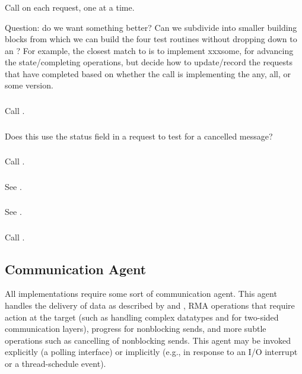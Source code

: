 \documentclass{article}
\begin{document}
\subsubsection{}
Call  on each request, one at a time.

Question: do we want something better?  Can we subdivide
 into smaller building blocks from which we
can build the four test routines without dropping down to an
?  For example, the closest match to  is to
implement xxxsome, for advancing the state/completing operations, but decide
how to update/record the requests that have completed based on whether the
call is implementing the any, all, or some version.

\subsubsection{}
Call .

\subsubsection{}
Does this use the status field in a request to test for a cancelled message?

\subsubsection{}
Call .

\subsubsection{}
See .

\subsubsection{}
See .

\subsubsection{}
Call .

\subsection{Communication Agent}
\label{sec:comm-agent}
All implementations require some sort of communication agent.  This agent
handles the delivery of data as described by  and
, RMA operations that require action at the target (such as
handling complex datatypes and for two-sided communication layers),
progress for nonblocking sends, and more
subtle operations such as cancelling of nonblocking sends.  This agent may be
invoked explicitly (a polling interface) or implicitly (e.g., in response to
an I/O interrupt or a thread-schedule event).  
\end{document}
